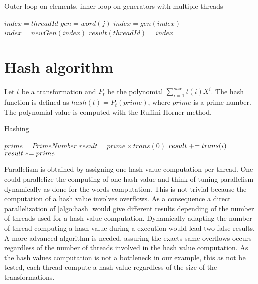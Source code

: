 {\begin{algorithm}
\caption{Outer loop on elements, inner loop on generators with multiple threads}
\label{algo:composepar}
\begin{algorithmic}
\STATE $index = threadId$
\STATE $gen = word(j)$
\STATE $index = gen(index)$
\ENDFOR
\STATE $index = newGen(index)$
\STATE $result(threadId) = index$
\ENDIF
\end{algorithmic}
\end{algorithm}


\section{Hash algorithm}
Let $t$ be a transformation and $P_{t}$ be the polynomial $\displaystyle\sum_{i=1}^{size} t(i)X^i$. The hash function is defined as $hash(t) = P_{t}(prime)$, where $prime$ is a prime number.
The polynomial value is computed with the Ruffini-Horner method.
\begin{algorithm}
\caption{Hashing}
\label{algo:hash}
\begin{algorithmic}
\STATE $prime = PrimeNumber$
\STATE $result = prime \times trans(0)$
\STATE $\switch result += trans(i)$
\STATE $\switch result *= prime$
\ENDFOR
\end{algorithmic}
\end{algorithm}
Parallelism is obtained by assigning one hash value computation per thread.
One could parallelize the computing of one hash value and think of tuning parallelism dynamically as done for the words computation. This is not trivial because the computation of a hash value involves overflows. As a consequence a direct parallelization of \autoref{algo:hash} would give different results depending of the number of threads used for a hash value computation. Dynamically adapting the number of thread computing a hash value during a execution would lead two false results. A more advanced algorithm is needed, assuring the exacts same overflows occurs regardless of the number of threads involved in the hash value computation. As the hash values computation is not a bottleneck in our example, this as not be tested, each thread compute a hash value regardless of the size of the transformations.


}
